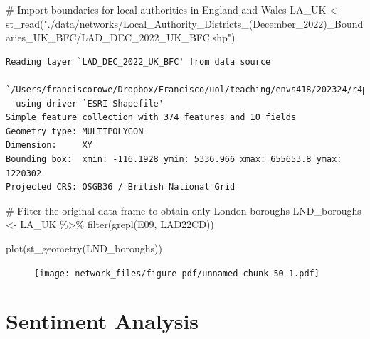 \documentclass[
  letterpaper,
  DIV=11,
  numbers=noendperiod]{scrreprt}
\newenvironment{Shaded}{\begin{snugshade}}{\end{snugshade}}
\newcommand{\CommentTok}[1]{\textcolor[rgb]{0.37,0.37,0.37}{#1}}
\newcommand{\FunctionTok}[1]{\textcolor[rgb]{0.28,0.35,0.67}{#1}}
\newcommand{\NormalTok}[1]{\textcolor[rgb]{0.00,0.23,0.31}{#1}}
\newcommand{\OtherTok}[1]{\textcolor[rgb]{0.00,0.23,0.31}{#1}}
\newcommand{\SpecialCharTok}[1]{\textcolor[rgb]{0.37,0.37,0.37}{#1}}
\newcommand{\StringTok}[1]{\textcolor[rgb]{0.13,0.47,0.30}{#1}}
\begin{document}
\begin{Shaded}
\begin{Highlighting}[]
\CommentTok{\# Import boundaries for local authorities in England and Wales}
\NormalTok{LA\_UK }\OtherTok{\textless{}{-}} \FunctionTok{st\_read}\NormalTok{(}\StringTok{"./data/networks/Local\_Authority\_Districts\_(December\_2022)\_Boundaries\_UK\_BFC/LAD\_DEC\_2022\_UK\_BFC.shp"}\NormalTok{)}
\end{Highlighting}
\end{Shaded}

\begin{verbatim}
Reading layer `LAD_DEC_2022_UK_BFC' from data source 
  `/Users/franciscorowe/Dropbox/Francisco/uol/teaching/envs418/202324/r4ps/data/networks/Local_Authority_Districts_(December_2022)_Boundaries_UK_BFC/LAD_DEC_2022_UK_BFC.shp' 
  using driver `ESRI Shapefile'
Simple feature collection with 374 features and 10 fields
Geometry type: MULTIPOLYGON
Dimension:     XY
Bounding box:  xmin: -116.1928 ymin: 5336.966 xmax: 655653.8 ymax: 1220302
Projected CRS: OSGB36 / British National Grid
\end{verbatim}

\begin{Shaded}
\begin{Highlighting}[]
\CommentTok{\# Filter the original data frame to obtain only London boroughs}
\NormalTok{LND\_boroughs }\OtherTok{\textless{}{-}}\NormalTok{ LA\_UK }\SpecialCharTok{\%\textgreater{}\%} \FunctionTok{filter}\NormalTok{(}\FunctionTok{grepl}\NormalTok{(}\StringTok{\textquotesingle{}E09\textquotesingle{}}\NormalTok{, LAD22CD)) }

\FunctionTok{plot}\NormalTok{(}\FunctionTok{st\_geometry}\NormalTok{(LND\_boroughs))}
\end{Highlighting}
\end{Shaded}

\begin{figure}[H]

{\centering \texttt{[image: network\_files/figure-pdf/unnamed-chunk-50-1.pdf]}

}

\end{figure}


\hypertarget{sec-chp6}{%
\chapter{Sentiment Analysis}\label{sec-chp6}}
\end{document}
